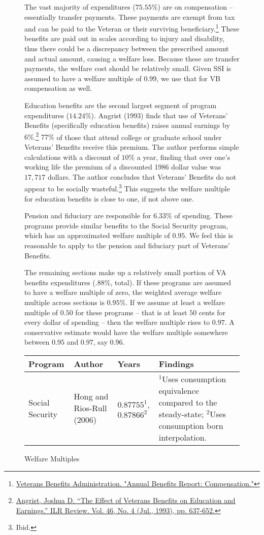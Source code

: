 \documentclass{article}
\begin{document}
\begin{figure}[H]
The vast majority of expenditures ($75.55\%$) are on compensation -- essentially transfer payments. These payments are exempt from tax and can be paid to the Veteran or their surviving beneficiary.\footnote{\href{http://www.benefits.va.gov/REPORTS/abr/ABR-Compensation-FY14-10202015.pdf}{Veterans Benefits Administration. "Annual Benefits Report: Compensation."}} These benefits are paid out in scales according to injury and disability, thus there could be a discrepancy between the prescribed amount and actual amount, causing a welfare loss. Because these are transfer payments, the welfare cost should be relatively small. Given SSI is assumed to have a welfare multiple of $0.99$, we use that for VB compensation as well.

Education benefits are the second largest segment of program expenditures ($14.24\%$). Angrist (1993) finds that use of Veterans' Benefits (specifically education benefits) raises annual earnings by $6\%$.\footnote{\href{http://www.jstor.org/stable/2524309}{Angrist, Joshua D. “The Effect of Veterans Benefits on Education and Earnings.” ILR Review. Vol. 46, No. 4 (Jul., 1993), pp. 637-652.}} $77\%$ of those that attend college or graduate school under Veterans' Benefits receive this premium. The author performs simple calculations with a discount of $10\%$ a year, finding that over one's working life the premium of a discounted 1986 dollar value was $17,717$ dollars. The author concludes that Veterans' Benefits do not appear to be socially wasteful.\footnote{Ibid.} This suggests the welfare multiple for education benefits is close to one, if not above one.

Pension and fiduciary are responsible for $6.33\%$ of spending. These programs provide similar benefits to the Social Security program, which has an approximated welfare multiple of $0.95$. We feel this is reasonable to apply to the pension and fiduciary part of Veterans' Benefits.

The remaining sections make up a relatively small portion of VA benefits expenditures ($.88\%$, total). If these programs are assumed to have a welfare multiple of zero, the weighted average welfare multiple across sections is $0.95\%$. If we assume at least a welfare multiple of $0.50$ for these programs -- that is at least $50$ cents for every dollar of spending -- then the welfare multiple rises to $0.97$. A conservative estimate would have the welfare multiple somewhere between $0.95$ and $0.97$, say $0.96$.

\begin{sidewaystable}
\caption{Welfare Multiples}
\centering
\label{Measures of In-kind Program Welfare Effects}
\begin{tabularx}{\textwidth}{l X l X}
\toprule
Program		&		
Author		&		
Years		&
Findings	\\
\midrule
Social Security	&
Hong and Rios-Rull (2006)	&
$0.87755^1$, $0.87866^2$ &
$^1$Uses consumption equivalence compared to the steady-state;
$^2$Uses consumption born interpolation. \\


\end{tabularx}
\end{sidewaystable}
\end{figure}
\end{document}
